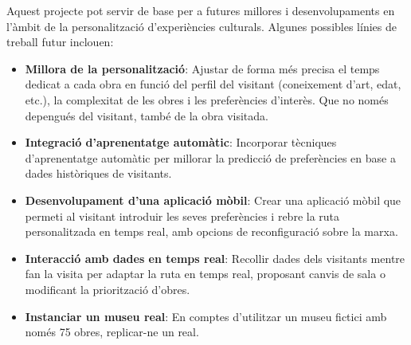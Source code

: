 \documentclass[a4paper]{article}
\begin{document}
	Aquest projecte pot servir de base per a futures millores i desenvolupaments en l'àmbit de la personalització d'experiències culturals. Algunes possibles línies de treball futur inclouen:
	
	\begin{itemize}
		\item \textbf{Millora de la personalització}: Ajustar de forma més precisa el temps dedicat a cada obra en funció del perfil del visitant (coneixement d'art, edat, etc.), la complexitat de les obres i les preferències d'interès. Que no només depengués del visitant, també de la obra visitada.
		\item \textbf{Integració d'aprenentatge automàtic}: Incorporar tècniques d'aprenentatge automàtic per millorar la predicció de preferències en base a dades històriques de visitants.
		\item \textbf{Desenvolupament d'una aplicació mòbil}: Crear una aplicació mòbil que permeti al visitant introduir les seves preferències i rebre la ruta personalitzada en temps real, amb opcions de reconfiguració sobre la marxa.
		\item \textbf{Interacció amb dades en temps real}: Recollir dades dels visitants mentre fan la visita per adaptar la ruta en temps real, proposant canvis de sala o modificant la priorització d'obres.
		\item \textbf{Instanciar un museu real}: En comptes d'utilitzar un museu fictici amb només 75 obres, replicar-ne un real.
	\end{itemize}
	
\end{document}
